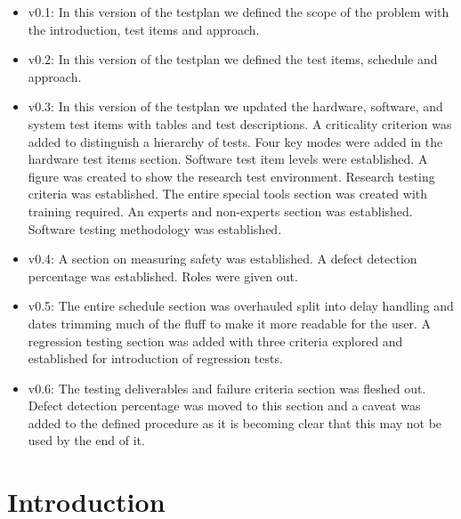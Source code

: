 \documentclass[english,12pt]{article}
\begin{document}
\begin{itemize}
	\item v0.1: In this version of the testplan we defined the  
    scope of the problem with the introduction, test items and 
    approach.
    \item v0.2: In this version of the testplan we defined the  
    test items, schedule and approach.
    \item v0.3: In this version of the testplan we updated 
    the hardware, software, and system test items with 
    tables and test descriptions. A criticality criterion 
    was added to distinguish a hierarchy of tests. Four key 
    modes were added in the hardware test items section. 
    Software test item levels were established. A figure 
    was created to show the research test environment. 
    Research testing criteria was established. The entire 
    special tools section was created with training required.
    An experts and non-experts section was established.
    Software testing methodology was established.
    \item v0.4: A section on measuring safety was established.
    A defect detection percentage was established.
    Roles were given out.
    \item v0.5: The entire schedule section was overhauled split into 
    delay handling and dates trimming much of the fluff to make it more 
    readable for the user. A regression testing section was added with three 
    criteria explored and established for introduction of regression tests.
    \item v0.6: The testing deliverables and failure criteria section was fleshed out.
    Defect detection percentage was moved to this section and a caveat was added to the 
    defined procedure as it is becoming clear that this may not be used by the end of it.
\end{itemize}


\section{Introduction}
\end{document}
